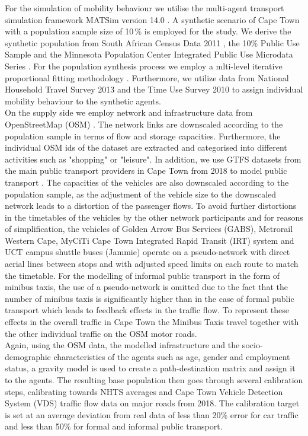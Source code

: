 \documentclass[main.tex]{subfiles}
\begin{document}
For the simulation of mobility behaviour we utilise the multi-agent transport simulation framework MATSim version 14.0 \citep{Horni.2016}. A synthetic scenario of Cape Town with a population sample size of 10\,\% is employed for the study. We derive the synthetic population from South African Census Data 2011 \citep{census2011}, the 10\% Public Use Sample \citep{census2011public10pct} and the Minnesota Population Center Integrated Public Use Microdata Series \citep{mpc2020}. For the population synthesis process we employ a mlti-level iterative proportional fitting methodology \citep{joubert2014mipf}. Furthermore, we utilize data from National Household Travel Survey 2013 \citep{nhts2013} and the Time Use Survey 2010 \citep{tus2013} to assign individual mobility behaviour to the synthetic agents.  \\

On the supply side we employ network and infrastructure data from OpenStreetMap (OSM) \citep{osm}. The network links are downscaled according to the population sample in terms of flow and storage capacities. Furthermore, the individual OSM ids of the dataset are extracted and categorised into different activities such as "shopping" or "leisure". In addition, we use GTFS datasets from the main public transport providers in Cape Town from 2018 to model public transport \citep{transifeeds}. The capacities of the vehicles are also downscaled according to the population sample, as the adjustment of the vehicle size to the downscaled network leads to a distortion of the passenger flows. To avoid further distortions in the timetables of the vehicles by the other network participants and for reasons of simplification, the vehicles of Golden Arrow Bus Services (GABS), Metrorail Western Cape, MyCiTi Cape Town Integrated Rapid Transit (IRT) system and UCT campus shuttle buses (Jammie) operate on a pseudo-network with direct aerial lines between stops and with adjusted speed limits on each route to match the timetable. For the modelling of informal public transport in the form of minibus taxis, the use of a pseudo-network is omitted due to the fact that the number of minibus taxis is significantly higher than in the case of formal public transport which leads to feedback effects in the traffic flow. To represent these effects in the overall traffic in Cape Town the Minibus Taxis travel together with the other individual traffic on the OSM motor roads.\\

Again, using the OSM data, the modelled infrastructure and the socio-demographic characteristics of the agents such as age, gender and employment status, a gravity model is used to create a path-destination matrix and assign it to the agents. The resulting base population then goes through several calibration steps, calibrating towards NHTS averages and Cape Town Vehicle Detection System (VDS) traffic flow data on major roads from 2018. The calibration target is set at an average deviation from real data of less than 20\% error for car traffic and less than 50\% for formal and informal public transport.\\
\end{document}
